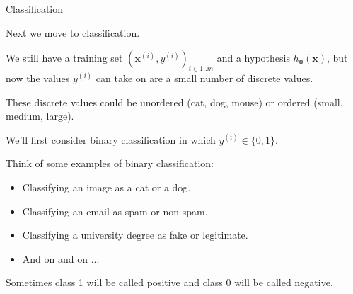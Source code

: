 \documentclass{beamer}
\renewcommand{\vec}[1]{\boldsymbol{#1}}
\begin{document}
\begin{frame}{Classification}
  
  Next we move to \alert{classification}.

  \medskip

  We still have a training set $(\vec{x}^{(i)},y^{(i)})_{i \in 1..m}$
  and a hypothesis $h_{\vec{\theta}}(\vec{x})$, but now the values
  $y^{(i)}$ can take on are a small number of discrete values.

  \medskip

  These discrete values could be \alert{unordered} (cat, dog, mouse)
  or \alert{ordered} (small, medium, large).

  \medskip

  We'll first consider \alert{binary classification} in which $y^{(i)}
  \in \{ 0, 1 \}$.

  \medskip
  
  Think of some examples of binary classification:
  \begin{itemize}
  \item Classifying an image as a cat or a dog.
  \item Classifying an email as spam or non-spam.
  \item Classifying a university degree as fake or legitimate.
  \item And on and on ...
  \end{itemize}

  \medskip

  Sometimes class 1 will be called \alert{positive} and class 0 will
  be called \alert{negative}.
  
\end{frame}
\end{document}
